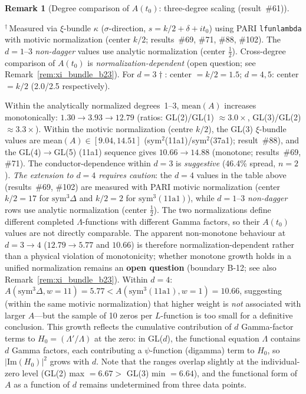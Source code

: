 \documentclass[11pt, a4paper]{article}
\theoremstyle{definition}
\newtheorem{remark}{Remark}[section]
\theoremstyle{plain}
\begin{document}
\begin{remark}[Degree comparison of $A(t_0)$: three-degree scaling (result~\#61)]
\begin{center}
\smallskip
{\small ${}^\dagger$\,Measured via $\xi$-bundle $\kappa$ ($\sigma$-direction,
$s = k/2 + \delta + it_0$) using PARI \texttt{lfunlambda} with motivic
normalization (center $k/2$; results~\#69, \#71, \#88, \#102).
The $d = 1$--$3$ \emph{non-dagger} values use analytic normalization (center $\tfrac{1}{2}$).
Cross-degree comparison of $A(t_0)$ is \emph{normalization-dependent}
(open question; see Remark~\ref{rem:xi_bundle_b23}).
For $d = 3\dagger$: center $= k/2 = 1.5$; $d = 4,5$: center $= k/2$ (2.0/2.5 respectively).}
\end{center}
\smallskip\noindent
Within the analytically normalized degrees~1--3, $\mathrm{mean}(A)$ increases
monotonically: $1.30 \to 3.93 \to 12.79$
(ratios: GL(2)/GL(1) $\approx 3.0\times$, GL(3)/GL(2) $\approx 3.3\times$).
Within the motivic normalization (centre $k/2$), the GL(3) $\xi$-bundle values
are mean$(A) \in [9.04, 14.51]$ (sym$^2$(11a1)/sym$^2$(37a1); result~\#88),
and the GL(4)$\to$GL(5) (11a1) sequence gives $10.66 \to 14.88$ (monotone;
results~\#69, \#71).  The conductor-dependence within $d=3$ is
\emph{suggestive} (46.4\% spread, $n{=}2$).
\emph{The extension to $d = 4$ requires caution}: the $d = 4$ values in the
table above (results~\#69, \#102) are measured with PARI motivic normalization
(center $k/2 = 17$ for $\mathrm{sym}^3\Delta$ and $k/2 = 2$ for
$\mathrm{sym}^3(11\mathrm{a}1)$), while $d = 1$--$3$ \emph{non-dagger} rows use analytic
normalization (center $\tfrac{1}{2}$).
The two normalizations define different completed $\Lambda$-functions with
different Gamma factors, so their $A(t_0)$ values are not directly comparable.
The apparent non-monotone behaviour at $d = 3 \to 4$
($12.79 \to 5.77$ and $10.66$) is therefore normalization-dependent
rather than a physical violation of monotonicity;
whether monotone growth holds in a unified normalization remains an
\textbf{open question} (boundary B-12; see also Remark~\ref{rem:xi_bundle_b23}).
Within $d = 4$: $A(\mathrm{sym}^3\Delta, w{=}11) = 5.77 < A(\mathrm{sym}^3(11\mathrm{a}1), w{=}1) = 10.66$,
suggesting (within the same motivic normalization) that higher weight
is \emph{not} associated with larger $A$---but the sample of 10 zeros per
$L$-function is too small for a definitive conclusion.
This growth reflects the cumulative contribution of $d$ Gamma-factor terms
to $H_0 = (\Lambda'/\Lambda)$ at the zero:
in GL($d$), the functional equation $\Lambda$ contains $d$ Gamma factors,
each contributing a $\psi$-function (digamma) term to $H_0$,
so $|{}\mathrm{Im}(H_0)|^2$ grows with $d$.
Note that the ranges overlap slightly at the individual-zero level
(GL(2) max $= 6.67 > $ GL(3) min $= 6.64$),
and the functional form of $A$ as a function of $d$ remains undetermined from
three data points.


\end{remark}
\end{document}
